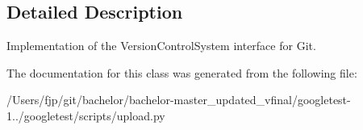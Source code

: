 \subsection{Detailed Description}
\begin{DoxyVerb}Implementation of the VersionControlSystem interface for Git.\end{DoxyVerb}
 

The documentation for this class was generated from the following file\+:\begin{DoxyCompactItemize}
\item 
/\+Users/fjp/git/bachelor/bachelor-\/master\+\_\+updated\+\_\+vfinal/googletest-\/1../googletest/scripts/upload.\+py\end{DoxyCompactItemize}
